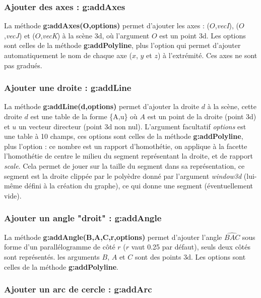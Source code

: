 \subsubsection{Ajouter des axes : g:addAxes}

La méthode \textbf{g:addAxes(O,options)} permet d'ajouter les axes : ($O$,\emph{vecI}), ($O$,\emph{vecJ}) et ($O$,\emph{vecK}) à la scène 3d, où l'argument $O$ est un point 3d. Les options sont celles de la méthode \textbf{g:addPolyline}, plus l'option  qui permet d'ajouter automatiquement le nom de chaque axe ($x$, $y$ et $z$) à l'extrémité. Ces axes ne sont pas gradués.
    
\subsubsection{Ajouter une droite : g:addLine}

La méthode \textbf{g:addLine(d,options)} permet d'ajouter la droite $d$ à la scène, cette droite $d$ est une table de la forme \{A,u\} où $A$ est un point de la droite (point 3d) et $u$ un vecteur directeur (point 3d non nul).  L'argument facultatif \emph{options} est une table à 10 champs, ces options sont celles de la méthode \textbf{g:addPolyline}, plus l'option  : ce nombre est un rapport d'homothétie, on applique à la facette l'homothétie de centre le milieu du segment représentant la droite, et de rapport \emph{scale}. Cela permet de jouer sur la taille du segment dans sa représentation, ce segment est la droite clippée par le polyèdre donné par l'argument \emph{window3d} (lui-même défini à la création du graphe), ce qui donne une segment (éventuellement vide).

\subsubsection{Ajouter un angle "droit" : g:addAngle}

La méthode \textbf{g:addAngle(B,A,C,r,options)} permet d'ajouter l'angle $\widehat{BAC}$ sous forme d'un parallélogramme de côté $r$ ($r$ vaut 0.25 par défaut), seuls deux côtés sont représentés. les arguments $B$, $A$ et $C$ sont des points 3d. Les options sont celles de la méthode \textbf{g:addPolyline}.

\subsubsection{Ajouter un arc de cercle : g:addArc}

